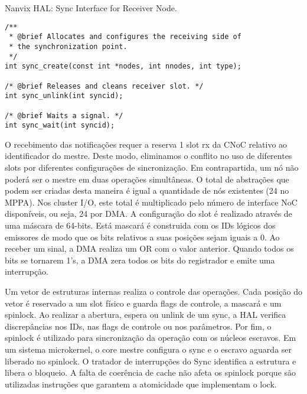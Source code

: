 \begin{listing}[!tb]
\caption{Nanvix HAL: Sync Interface for Receiver Node.}
\label{code:hal-sync-receiver}
\begin{verbatim}
/**
 * @brief Allocates and configures the receiving side of
 * the synchronization point.
 */
int sync_create(const int *nodes, int nnodes, int type);

/* @brief Releases and cleans receiver slot. */
int sync_unlink(int syncid);

/* @brief Waits a signal. */
int sync_wait(int syncid);
\end{verbatim}
\end{listing}

				O recebimento das notificações requer a reserva 1 slot rx da CNoC relativo ao identificador do mestre.
				Deste modo, eliminamos o conflito no uso de diferentes slots por diferentes configurações de sincronização.
				Em contrapartida, um nó não poderá ser o mestre em duas operações simultâneas.
				O total de abstrações que podem ser criadas desta maneira é igual a quantidade de nós existentes (24 no MPPA).
				Nos cluster I/O, este total é multiplicado pelo número de interface NoC disponíveis, ou seja, 24 por DMA.
				A configuração do slot é realizado através de uma máscara de 64-bits.
				Está mascará é construida com os IDs lógicos dos emissores de modo que os bits relativos a suas posições sejam iguais a 0.
				Ao receber um sinal, a DMA realiza um OR com o valor anterior.
				Quando todos os bits se tornarem 1's, a DMA zera todos os bits do registrador e emite uma interrupção.

				Um vetor de estruturas internas realiza o controle das operações.
				Cada posição do vetor é reservado a um slot físico e guarda flags de controle, a mascará e um spinlock.
				Ao realizar a abertura, espera ou unlink de um sync, a HAL verifica discrepâncias nos IDs, nas flags de controle ou nos parâmetros.
				Por fim, o spinlock é utilizado para sincronização da operação com os núcleos escravos.
				Em um sistema microkernel, o core mestre configura o sync e o escravo aguarda ser liberado no spinlock.
				O tratador de interrupções do Sync identifica a estrutura e libera o bloqueio.
				A falta de coerência de cache não afeta os spinlock porque são utilizadas instruções que garantem a atomicidade que implementam o lock.


